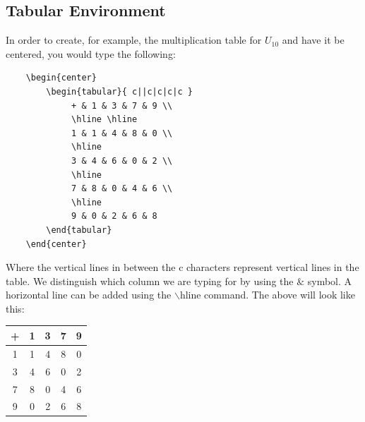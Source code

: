 \documentclass[]{article}
\newcommand{\dent}{\hspace{\parindent}} %
\begin{document}
    \subsection{Tabular Environment}
    \dent In order to create, for example, the multiplication table for $U_{10}$ and have it be centered, you would type the following:
    \begin{verbatim}
    \begin{center}
        \begin{tabular}{ c||c|c|c|c }
             + & 1 & 3 & 7 & 9 \\
             \hline \hline
             1 & 1 & 4 & 8 & 0 \\
             \hline
             3 & 4 & 6 & 0 & 2 \\
             \hline
             7 & 8 & 0 & 4 & 6 \\
             \hline
             9 & 0 & 2 & 6 & 8
        \end{tabular}
    \end{center}
    \end{verbatim}
    Where the vertical lines in between the c characters represent vertical lines in the table. We distinguish which column we are typing for by using the $\&$ symbol. A horizontal line can be added using the $\backslash$hline command. The above will look like this:
    \begin{center}
        \begin{tabular}{ c||c|c|c|c }
             + & 1 & 3 & 7 & 9 \\
             \hline \hline
             1 & 1 & 4 & 8 & 0 \\
             \hline
             3 & 4 & 6 & 0 & 2 \\
             \hline
             7 & 8 & 0 & 4 & 6 \\
             \hline
             9 & 0 & 2 & 6 & 8
        \end{tabular}
    \end{center}
\end{document}
